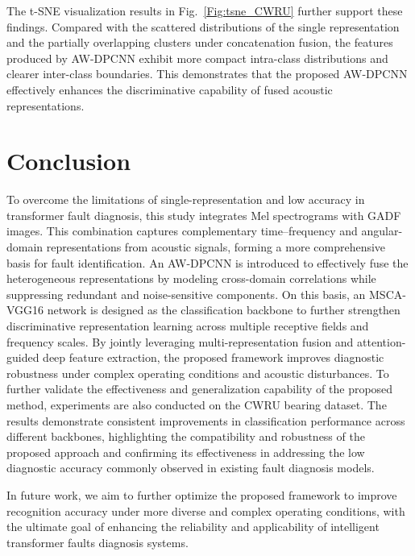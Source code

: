 \documentclass[journal]{IEEEtran}
\begin{document}
The t-SNE visualization results in Fig.~\ref{Fig:tsne_CWRU} further support these findings. Compared with the scattered distributions of the single representation and the partially overlapping clusters under concatenation fusion, the features produced by AW-DPCNN exhibit more compact intra-class distributions and clearer inter-class boundaries. This demonstrates that the proposed AW-DPCNN effectively enhances the discriminative capability of fused acoustic representations.

\section{Conclusion}
\label{section6}
To overcome the limitations of single-representation and low accuracy in transformer fault diagnosis, this study integrates Mel spectrograms with GADF images. This combination captures complementary time–frequency and angular-domain representations from acoustic signals, forming a more comprehensive basis for fault identification. An AW-DPCNN is introduced to effectively fuse the heterogeneous representations by modeling cross-domain correlations while suppressing redundant and noise-sensitive components. On this basis, an MSCA-VGG16 network is designed as the classification backbone to further strengthen discriminative representation learning across multiple receptive fields and frequency scales. By jointly leveraging multi-representation fusion and attention-guided deep feature extraction, the proposed framework improves diagnostic robustness under complex operating conditions and acoustic disturbances. To further validate the effectiveness and generalization capability of the proposed method, experiments are also conducted on the CWRU bearing dataset. The results demonstrate consistent improvements in classification performance across different backbones, highlighting the compatibility and robustness of the proposed approach and confirming its effectiveness in addressing the low diagnostic accuracy commonly observed in existing fault diagnosis models.

In future work, we aim to further optimize the proposed framework to improve recognition accuracy under more diverse and complex operating conditions, with the ultimate goal of enhancing the reliability and applicability of intelligent transformer faults diagnosis systems.



\end{document}
